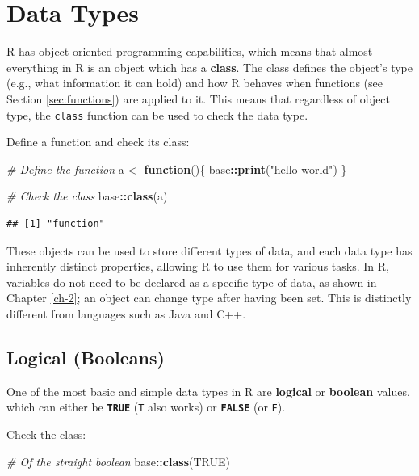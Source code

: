 \documentclass[
]{book}
\newenvironment{Shaded}{\begin{snugshade}}{\end{snugshade}}
\newcommand{\CommentTok}[1]{\textcolor[rgb]{0.56,0.35,0.01}{\textit{#1}}}
\newcommand{\ConstantTok}[1]{\textcolor[rgb]{0.56,0.35,0.01}{#1}}
\newcommand{\ControlFlowTok}[1]{\textcolor[rgb]{0.13,0.29,0.53}{\textbf{#1}}}
\newcommand{\FunctionTok}[1]{\textcolor[rgb]{0.13,0.29,0.53}{\textbf{#1}}}
\newcommand{\NormalTok}[1]{#1}
\newcommand{\OtherTok}[1]{\textcolor[rgb]{0.56,0.35,0.01}{#1}}
\newcommand{\SpecialCharTok}[1]{\textcolor[rgb]{0.81,0.36,0.00}{\textbf{#1}}}
\newcommand{\StringTok}[1]{\textcolor[rgb]{0.31,0.60,0.02}{#1}}
\begin{document}
\section{Data Types}\label{sec:dataTypes}

R has object-oriented programming capabilities, which means that almost everything in R is an object which has a \textbf{class}. The class defines the object's type (e.g., what information it can hold) and how R behaves when functions (see Section \ref{sec:functions}) are applied to it. This means that regardless of object type, the \texttt{class} function can be used to check the data type.

Define a function and check its class:

\begin{Shaded}
\begin{Highlighting}[]
\CommentTok{\# Define the function}
\NormalTok{a }\OtherTok{\textless{}{-}} \ControlFlowTok{function}\NormalTok{()\{}
\NormalTok{    base}\SpecialCharTok{::}\FunctionTok{print}\NormalTok{(}\StringTok{"hello world"}\NormalTok{)}
\NormalTok{\}}

\CommentTok{\# Check the class}
\NormalTok{base}\SpecialCharTok{::}\FunctionTok{class}\NormalTok{(a)}
\end{Highlighting}
\end{Shaded}

\begin{verbatim}
## [1] "function"
\end{verbatim}

These objects can be used to store different types of data, and each data type has inherently distinct properties, allowing R to use them for various tasks. In R, variables do not need to be declared as a specific type of data, as shown in Chapter \ref{ch-2}; an object can change type after having been set. This is distinctly different from languages such as Java and C++.

\subsection{Logical (Booleans)}\label{sec:boolean}

One of the most basic and simple data types in R are \textbf{logical} or \textbf{boolean} values, which can either be \textbf{\texttt{TRUE}} (\texttt{T} also works) or \textbf{\texttt{FALSE}} (or \texttt{F}).

Check the class:

\begin{Shaded}
\begin{Highlighting}[]
\CommentTok{\# Of the straight boolean}
\NormalTok{base}\SpecialCharTok{::}\FunctionTok{class}\NormalTok{(}\ConstantTok{TRUE}\NormalTok{)}
\end{Highlighting}
\end{Shaded}
\end{document}
